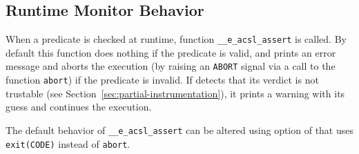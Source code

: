 



\subsection{Runtime Monitor Behavior}
\label{sec:monitor-behavior}

When a predicate is checked at runtime, function
\texttt{\_\_e\_acsl\_assert} is called.  By default
this function does nothing if the predicate is valid, and prints an error
message and aborts the execution (by raising an \texttt{ABORT} signal via a call
to the \C function \texttt{abort}) if the predicate is invalid. If \eacsl
detects that its verdict is not trustable (see
Section~\ref{sec:partial-instrumentation}), it prints a warning with its guess
and continues the execution.

The default behavior of \texttt{\_\_e\_acsl\_assert}
can be altered using  option of \eacslgcc
that uses \texttt{exit(CODE)} instead of \texttt{abort}.

